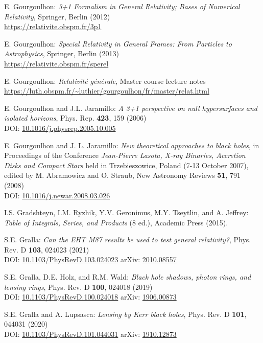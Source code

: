 \begin{thebibliography}{123}
E. Gourgoulhon: {\em 3+1 Formalism in General Relativity; Bases of Numerical Relativity},
Springer, Berlin (2012)\\
\url{https://relativite.obspm.fr/3p1}

E. Gourgoulhon: {\em Special Relativity in General Frames: From Particles to Astrophysics},
Springer, Berlin (2013) \\
\url{https://relativite.obspm.fr/sperel}

E. Gourgoulhon: {\em Relativit\'e g\'en\'erale},
Master course lecture notes\\
\url{https://luth.obspm.fr/~luthier/gourgoulhon/fr/master/relat.html}

E. Gourgoulhon and J.L. Jaramillo: {\em A 3+1 perspective on null hypersurfaces and isolated horizons},
Phys. Rep. {\bf 423}, 159 (2006)\\
DOI: \href{https://doi.org/10.1016/j.physrep.2005.10.005}{10.1016/j.physrep.2005.10.005}

E. Gourgoulhon and J. L. Jaramillo: {\em New theoretical approaches to black holes},
in Proceedings of the Conference {\em Jean-Pierre Lasota, X-ray Binaries, Accretion Disks and Compact Stars} held in Trzebieszowice, Poland (7-13 October 2007), edited by M. Abramowicz and O. Straub, New Astronomy Reviews {\bf 51}, 791 (2008) \\
DOI: \href{https://doi.org/10.1016/j.newar.2008.03.026}{10.1016/j.newar.2008.03.026}

I.S. Gradshteyn, I.M. Ryzhik, Y.V. Geronimus, M.Y. Tseytlin, and A. Jeffrey:
{\em  Table of Integrals, Series, and Products} (8 ed.),
Academic Press (2015).

S.E. Gralla:
{\em Can the EHT M87 results be used to test general relativity?},
Phys. Rev. D {\bf 103}, 024023 (2021)\\
DOI: \href{https://doi.org/10.1103/PhysRevD.103.024023}{10.1103/PhysRevD.103.024023}\hfill
arXiv: \href{https://arxiv.org/abs/2010.08557}{2010.08557}

S.E. Gralla, D.E. Holz, and R.M. Wald:
{\em Black hole shadows, photon rings, and lensing rings},
Phys. Rev. D {\bf 100}, 024018 (2019)\\
DOI: \href{https://doi.org/10.1103/PhysRevD.100.024018}{10.1103/PhysRevD.100.024018}\hfill
arXiv: \href{https://arxiv.org/abs/1906.00873}{1906.00873}

S.E. Gralla and A. Lupsasca:
{\em Lensing by Kerr black holes},
Phys. Rev. D {\bf 101}, 044031 (2020)\\
DOI: \href{https://doi.org/10.1103/PhysRevD.101.044031}{10.1103/PhysRevD.101.044031}\hfill
arXiv: \href{https://arxiv.org/abs/1910.12873}{1910.12873}


\end{thebibliography}
